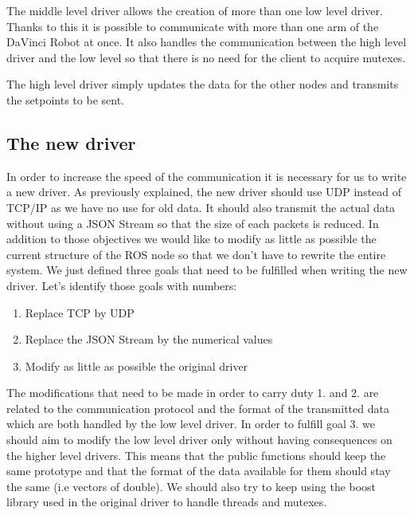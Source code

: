 The middle level driver allows the creation of more than one low level driver. Thanks to this it is possible to communicate with more than one arm of the DaVinci Robot at once. It also handles the communication between the high level driver and the low level so that there is no need for the client to acquire mutexes.

The high level driver simply updates the data for the other nodes and transmits the setpoints to be sent.


\subsection{The new driver}

In order to increase the speed of the communication it is necessary for us to write a new driver. As previously explained, the new driver should use UDP instead of TCP/IP as we have no use for old data. It should also transmit the actual data without using a JSON Stream so that the size of each packets is reduced. In addition to those objectives we would like to modify as little as possible the current structure of the ROS node so that we don't have to rewrite the entire system. 
We just defined three goals that need to be fulfilled when writing the new driver. Let's identify those goals with numbers:
\begin{enumerate}
	\item Replace TCP by UDP
	\item Replace the JSON Stream by the numerical values
	\item Modify as little as possible the original driver
\end{enumerate}

The modifications that need to be made in order to carry duty 1. and 2. are related to the communication protocol and the format of the transmitted data which are both handled by the low level driver. In order to fulfill goal 3. we should aim to modify the low level driver only without having consequences on the higher level drivers. This means that the public functions should keep the same prototype and that the format of the data available for them should stay the same (i.e vectors of double). We should also try to keep using the boost library used in the original driver to handle threads and mutexes.

